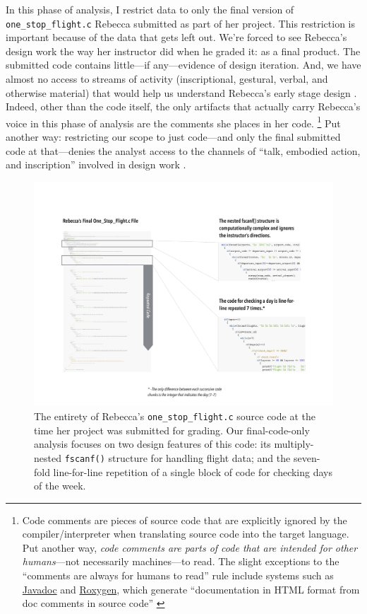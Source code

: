 In this phase of analysis, I restrict data to only the final version of \texttt{one\_stop\_flight.c} Rebecca submitted as part of her project. This restriction is important because of the data that gets left out. We're forced to see Rebecca's design work the way her instructor did when he graded it: as a final product. The submitted code contains little---if any---evidence of design iteration. And, we have almost no access to streams of activity (inscriptional, gestural, verbal, and otherwise material) that would help us understand Rebecca's early stage design \citep{petre_software_2014}. Indeed, other than the code itself, the only artifacts that actually carry Rebecca's voice in this phase of analysis are the comments she places in her code. \footnote{Code comments are pieces of source code that are explicitly ignored by the compiler/interpreter when translating source code into the target language. Put another way, \emph{code comments are parts of code that are intended for other humans}---not necessarily machines---to read. The slight exceptions to the ``comments are always for humans to read'' rule include systems such as \href{http://www.oracle.com/technetwork/articles/java/index-jsp-135444.html}{Javadoc} and \href{https://cran.r-project.org/web/packages/roxygen2/index.html}{Roxygen}, which generate ``documentation in HTML format from doc comments in source code'' \citep{oraclecorporation_javadoc_2016}} Put another way: restricting our scope to just code---and only the final submitted code at that---denies the analyst access to the channels of ``talk, embodied action, and inscription'' involved in design work \citep[ p.~179]{hall_disrupting_2002}.

\begin{figure}[htbp]
\centering
\includegraphics{RebeccasCode/OneStopFlightSupergraphic.pdf}
\caption{The entirety of Rebecca's \texttt{one\_stop\_flight.c} source code at the time her project was submitted for grading. Our final-code-only analysis focuses on two design features of this code: its multiply-nested \texttt{fscanf()} structure for handling flight data; and the seven-fold line-for-line repetition of a single block of code for checking days of the week.}
\end{figure}

